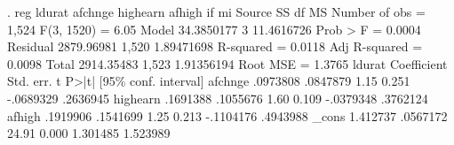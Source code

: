 . reg ldurat afchnge highearn afhigh if mi
{\smallskip}
      Source {\VBAR}       SS           df       MS      Number of obs   =     1,524
   F(3, 1520)      =      6.05
       Model {\VBAR}  34.3850177         3  11.4616726   Prob > F        =    0.0004
    Residual {\VBAR}  2879.96981     1,520  1.89471698   R-squared       =    0.0118
   Adj R-squared   =    0.0098
       Total {\VBAR}  2914.35483     1,523  1.91356194   Root MSE        =    1.3765
{\smallskip}
      ldurat {\VBAR} Coefficient  Std. err.      t    P>|t|     [95\% conf. interval]
     afchnge {\VBAR}   .0973808   .0847879     1.15   0.251    -.0689329    .2636945
    highearn {\VBAR}   .1691388   .1055676     1.60   0.109    -.0379348    .3762124
      afhigh {\VBAR}   .1919906   .1541699     1.25   0.213    -.1104176    .4943988
       _cons {\VBAR}   1.412737   .0567172    24.91   0.000     1.301485    1.523989
{\smallskip}
